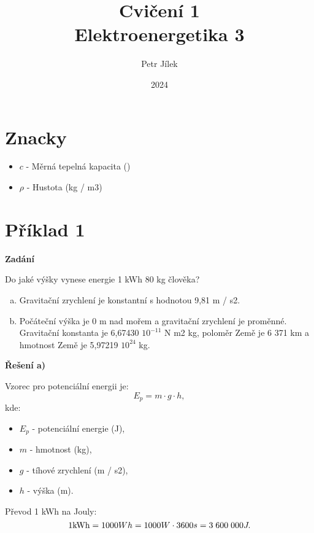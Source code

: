 \documentclass{article}
\title{\textbf{Cvičení 1}\\Elektroenergetika 3}
\author{Petr Jílek}
\date{2024}
\begin{document}



\maketitle

\tableofcontents



\section*{Znacky}

\begin{itemize}
    \item $c$ - Měrná tepelná kapacita (\ueqJperKGperK)
    \item $\rho$ - Hustota (kg / m3)
\end{itemize}

\newpage



\section*{Příklad 1}

\textbf{Zadání}

Do jaké výšky vynese energie 1 kWh 80 kg člověka?

\begin{enumerate}[a)]
    \item Gravitační zrychlení je konstantní s hodnotou 9,81 m / s2.
    \item Počáteční výška je 0 m nad mořem a gravitační zrychlení je proměnné. Gravitační konstanta je 6,67430 \myFS $10^{-11}$ N \myFS m2 \myFS kg, poloměr Země je 6 371 km a hmotnost Země je 5,97219 \myFS $10^{24}$ kg.
\end{enumerate}

\textbf{Řešení a)}

Vzorec pro potenciální energii je:
$$
    E_p = m \cdot g \cdot h,
$$
kde:
\begin{itemize}
    \item $E_p$ - potenciální energie (J),
    \item $m$ - hmotnost (kg),
    \item $g$ - tíhové zrychlení (m / s2),
    \item $h$ - výška (m).
\end{itemize}

Převod 1 kWh na Jouly:
$$
    1 \textrm{kWh} = 1000 Wh = 1000 W \cdot 3600 s = 3 \; 600 \; 000 J.
$$
\end{document}
